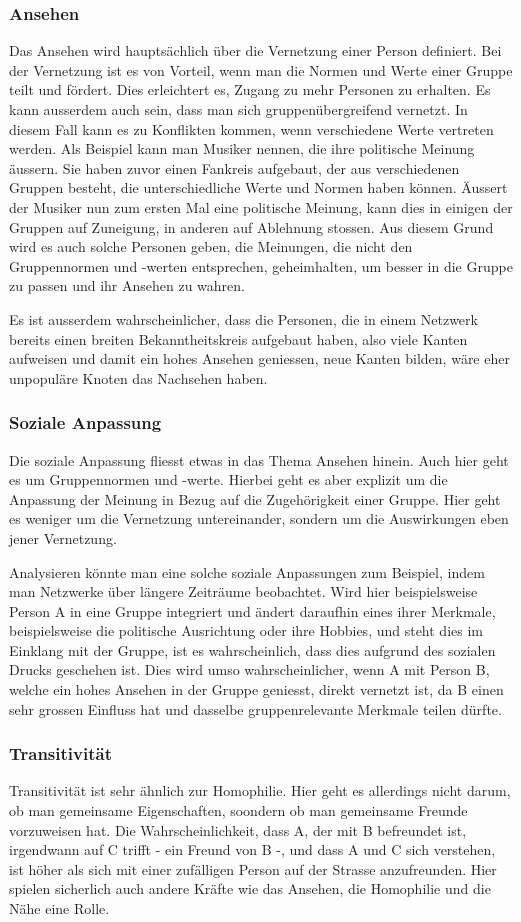 \subsubsection{Ansehen}
Das Ansehen wird hauptsächlich über die Vernetzung einer Person definiert. Bei der Vernetzung ist es von Vorteil, wenn
man die Normen und Werte einer Gruppe teilt und fördert. Dies erleichtert es, Zugang zu mehr Personen zu erhalten. Es
kann ausserdem auch sein, dass man sich gruppenübergreifend vernetzt. In diesem Fall kann es zu Konflikten kommen, wenn
verschiedene Werte vertreten werden. Als Beispiel kann man Musiker nennen, die ihre politische Meinung äussern. Sie
haben zuvor einen Fankreis aufgebaut, der aus verschiedenen Gruppen besteht, die unterschiedliche Werte und Normen
haben können. Äussert der Musiker nun zum ersten Mal eine politische Meinung, kann dies in einigen der Gruppen auf
Zuneigung, in anderen auf Ablehnung stossen. Aus diesem Grund wird es auch solche Personen geben, die Meinungen, die
nicht den Gruppennormen und -werten entsprechen, geheimhalten, um besser in die Gruppe zu passen und ihr Ansehen zu wahren.

Es ist ausserdem wahrscheinlicher, dass die Personen, die in einem Netzwerk bereits einen breiten Bekanntheitskreis
aufgebaut haben, also viele Kanten aufweisen und damit ein hohes Ansehen geniessen, neue Kanten bilden, wäre eher
unpopuläre Knoten das Nachsehen haben.

\subsubsection{Soziale Anpassung}
Die soziale Anpassung fliesst etwas in das Thema Ansehen hinein. Auch hier geht es um Gruppennormen und -werte. Hierbei
geht es aber explizit um die Anpassung der Meinung in Bezug auf die Zugehörigkeit einer Gruppe. Hier geht es weniger
um die Vernetzung untereinander, sondern um die Auswirkungen eben jener Vernetzung.

Analysieren könnte man eine solche soziale Anpassungen zum Beispiel, indem man Netzwerke über längere Zeiträume
beobachtet. Wird hier beispielsweise Person A in eine Gruppe integriert und ändert daraufhin eines ihrer Merkmale,
beispielsweise die politische Ausrichtung oder ihre Hobbies, und steht dies im Einklang mit der Gruppe, ist es
wahrscheinlich, dass dies aufgrund des sozialen Drucks geschehen ist. Dies wird umso wahrscheinlicher, wenn A mit Person B,
welche ein hohes Ansehen in der Gruppe geniesst, direkt vernetzt ist, da B einen sehr grossen Einfluss hat und dasselbe
gruppenrelevante Merkmale teilen dürfte.

\subsubsection{Transitivität}
Transitivität ist sehr ähnlich zur Homophilie. Hier geht es allerdings nicht darum, ob man gemeinsame Eigenschaften,
soondern ob man gemeinsame Freunde vorzuweisen hat. Die Wahrscheinlichkeit, dass A, der mit B befreundet ist, irgendwann
auf C trifft - ein Freund von B -, und dass A und C sich verstehen, ist höher als sich mit einer zufälligen Person auf
der Strasse anzufreunden. Hier spielen sicherlich auch andere Kräfte wie das Ansehen, die Homophilie und die Nähe eine Rolle.